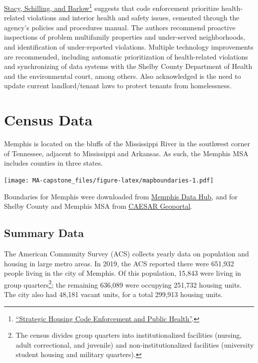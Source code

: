 \documentclass[
  openany]{book}
\begin{document}
\protect\hyperlink{ref-stacy2018}{Stacy, Schilling, and Barlow}\footnote{\protect\hyperlink{ref-stacy2018}{{``Strategic Housing Code Enforcement and Public Health''}}.} suggests that code enforcement prioritize health-related violations and interior health and safety issues, cemented through the agency's policies and procedures manual. The authors recommend proactive inspections of problem multifamily properties and under-served neighborhoods, and identification of under-reported violations. Multiple technology improvements are recommended, including automatic prioritization of health-related violations and synchronizing of data systems with the Shelby County Department of Health and the environmental court, among others. Also acknowledged is the need to update current landlord/tenant laws to protect tenants from homelessness.

\hypertarget{census-data}{%
\chapter{Census Data}\label{census-data}}

Memphis is located on the bluffs of the Mississippi River in the southwest corner of Tennessee, adjacent to Mississippi and Arkansas. As such, the Memphis MSA includes counties in three states.

\texttt{[image: MA-capstone\_files/figure-latex/mapboundaries-1.pdf]}

Boundaries for Memphis were downloaded from \href{https://data.memphistn.gov/dataset/Jurisdiction-Boundary-Memphis/b9uj-qyia}{Memphis Data Hub}, and for Shelby County and Memphis MSA from \href{https://geoportal.memphis.edu/}{CAESAR Geoportal}.

\hypertarget{summary-data}{%
\section{Summary Data}\label{summary-data}}

The American Community Survey (ACS) collects yearly data on population and housing in large metro areas. In 2019, the ACS reported there were 651,932 people living in the city of Memphis. Of this population, 15,843 were living in group quarters\footnote{The census divides group quarters into institutionalized facilities (nursing, adult correctional, and juvenile) and non-institutionalized facilities (university student housing and military quarters).}; the remaining 636,089 were occupying 251,732 housing units. The city also had 48,181 vacant units, for a total 299,913 housing units.
\end{document}
